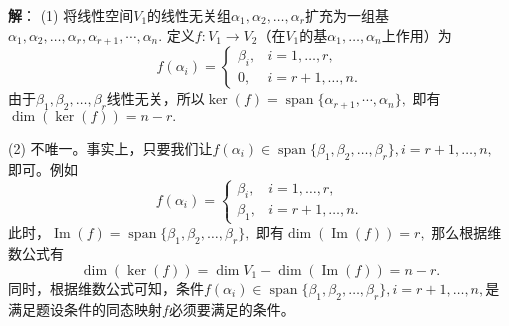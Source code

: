 {\bf 解}： (1) 将线性空间$V_1$的线性无关组$\alpha_1, \alpha_2, \ldots, \alpha_r$扩充为一组基$\alpha_1, \alpha_2, \ldots, \alpha_r, \alpha_{r+1}, \cdots, \alpha_n.$ 定义$f: V_1 \rightarrow V_2$（在$V_1$的基$\alpha_1, \ldots, \alpha_n$上作用）为
$$
f(\alpha_i) = \begin{cases}
\beta_i, & i = 1, \ldots, r, \\
0, & i = r+1, \ldots, n.
\end{cases}
$$
由于$\beta_1, \beta_2, \ldots, \beta_r$线性无关，所以$\ker(f) = \operatorname{span}\{ \alpha_{r+1}, \cdots, \alpha_n \},$ 即有$\dim(\ker(f)) = n-r.$

(2) 不唯一。事实上，只要我们让$f(\alpha_i) \in \operatorname{span} \{ \beta_1, \beta_2, \ldots, \beta_r \}, i = r+1, \ldots, n,$ 即可。例如
$$
f(\alpha_i) = \begin{cases}
\beta_i, & i = 1, \ldots, r, \\
\beta_1, & i = r+1, \ldots, n.
\end{cases}
$$
此时，$\operatorname{Im}(f) = \operatorname{span} \{ \beta_1, \beta_2, \ldots, \beta_r \},$ 即有$\dim(\operatorname{Im}(f)) = r,$ 那么根据维数公式有
$$\dim(\ker(f)) = \dim V_1 - \dim(\operatorname{Im}(f)) = n - r.$$
同时，根据维数公式可知，条件$f(\alpha_i) \in \operatorname{span} \{ \beta_1, \beta_2, \ldots, \beta_r \}, i = r+1, \ldots, n,$是满足题设条件的同态映射$f$必须要满足的条件。


